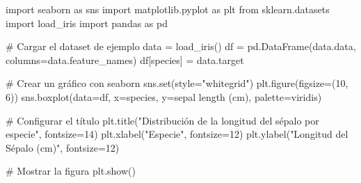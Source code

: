 \documentclass[
  10pt,
]{article}
\newenvironment{Shaded}{\begin{snugshade}}{\end{snugshade}}
\newcommand{\BuiltInTok}[1]{\textcolor[rgb]{0.00,0.23,0.31}{#1}}
\newcommand{\CommentTok}[1]{\textcolor[rgb]{0.37,0.37,0.37}{#1}}
\newcommand{\DecValTok}[1]{\textcolor[rgb]{0.68,0.00,0.00}{#1}}
\newcommand{\ImportTok}[1]{\textcolor[rgb]{0.00,0.46,0.62}{#1}}
\newcommand{\NormalTok}[1]{\textcolor[rgb]{0.00,0.23,0.31}{#1}}
\newcommand{\OperatorTok}[1]{\textcolor[rgb]{0.37,0.37,0.37}{#1}}
\newcommand{\StringTok}[1]{\textcolor[rgb]{0.13,0.47,0.30}{#1}}
\begin{document}
\begin{Shaded}
\begin{Highlighting}[]
\ImportTok{import}\NormalTok{ seaborn }\ImportTok{as}\NormalTok{ sns}
\ImportTok{import}\NormalTok{ matplotlib.pyplot }\ImportTok{as}\NormalTok{ plt}
\ImportTok{from}\NormalTok{ sklearn.datasets }\ImportTok{import}\NormalTok{ load\_iris}
\ImportTok{import}\NormalTok{ pandas }\ImportTok{as}\NormalTok{ pd}

\CommentTok{\# Cargar el dataset de ejemplo}
\NormalTok{data }\OperatorTok{=}\NormalTok{ load\_iris()}
\NormalTok{df }\OperatorTok{=}\NormalTok{ pd.DataFrame(data.data, columns}\OperatorTok{=}\NormalTok{data.feature\_names)}
\NormalTok{df[}\StringTok{\textquotesingle{}species\textquotesingle{}}\NormalTok{] }\OperatorTok{=}\NormalTok{ data.target}

\CommentTok{\# Crear un gráfico con seaborn}
\NormalTok{sns.}\BuiltInTok{set}\NormalTok{(style}\OperatorTok{=}\StringTok{"whitegrid"}\NormalTok{)}
\NormalTok{plt.figure(figsize}\OperatorTok{=}\NormalTok{(}\DecValTok{10}\NormalTok{, }\DecValTok{6}\NormalTok{))}
\NormalTok{sns.boxplot(data}\OperatorTok{=}\NormalTok{df, x}\OperatorTok{=}\StringTok{\textquotesingle{}species\textquotesingle{}}\NormalTok{, y}\OperatorTok{=}\StringTok{\textquotesingle{}sepal length (cm)\textquotesingle{}}\NormalTok{, palette}\OperatorTok{=}\StringTok{\textquotesingle{}viridis\textquotesingle{}}\NormalTok{)}

\CommentTok{\# Configurar el título}
\NormalTok{plt.title(}\StringTok{"Distribución de la longitud del sépalo por especie"}\NormalTok{, fontsize}\OperatorTok{=}\DecValTok{14}\NormalTok{)}
\NormalTok{plt.xlabel(}\StringTok{"Especie"}\NormalTok{, fontsize}\OperatorTok{=}\DecValTok{12}\NormalTok{)}
\NormalTok{plt.ylabel(}\StringTok{"Longitud del Sépalo (cm)"}\NormalTok{, fontsize}\OperatorTok{=}\DecValTok{12}\NormalTok{)}

\CommentTok{\# Mostrar la figura}
\NormalTok{plt.show()}
\end{Highlighting}
\end{Shaded}
\end{document}

